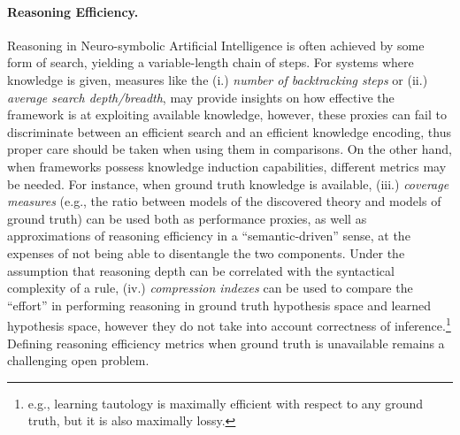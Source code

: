 \paragraph{Reasoning Efficiency.} Reasoning in Neuro-symbolic Artificial Intelligence is often achieved by some form of search, yielding a variable-length chain of steps. For systems where knowledge is given, measures like the (i.) \textit{number of backtracking steps} or (ii.) \textit{average search depth/breadth}, may provide insights on how effective the framework is at exploiting available knowledge, however, these proxies can fail to discriminate between an efficient search and an efficient knowledge encoding, thus proper care should be taken when using them in comparisons.
%
On the other hand, when frameworks possess knowledge induction capabilities, different metrics may be needed. For instance, when ground truth knowledge is available, (iii.) \textit{coverage measures} (e.g., the ratio between models of the discovered theory and models of ground truth) can be used both as performance proxies, as well as approximations of reasoning efficiency in a ``semantic-driven'' sense, at the expenses of not being able to disentangle the two components. Under the assumption that reasoning depth can be correlated with the syntactical complexity of a rule, (iv.) \textit{compression indexes} can be used to compare the ``effort'' in performing reasoning in ground truth hypothesis space and learned hypothesis space, however they do not take into account correctness of inference.\footnote{e.g., learning tautology is maximally efficient with respect to any ground truth, but it is also maximally lossy.}
%
Defining reasoning efficiency metrics %
when ground truth is unavailable remains a challenging open problem.


